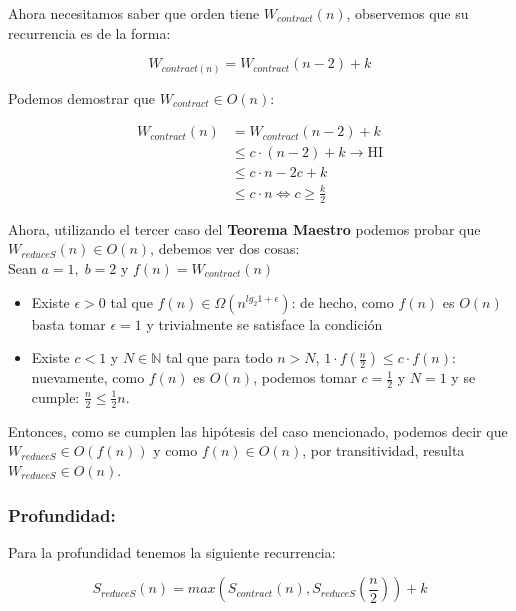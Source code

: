 \documentclass[11pt]{article}
\begin{document}
Ahora necesitamos saber que orden tiene $W_{contract}(n)$, observemos que su 
recurrencia es de la forma:

\begin{equation*}
    W_{contract(n)} = W_{contract}(n-2) + k 
\end{equation*}

Podemos demostrar que $W_{contract} \in O(n)$:

\begin{align*}
    W_{contract}(n) & = W_{contract}(n - 2) + k \\
             & \leq c \cdot (n - 2) + k \rightarrow \text{HI}\\
             & \leq c \cdot n - 2c + k \\
             & \leq c \cdot n \iff c \geq \frac{k}{2}
\end{align*}

Ahora, utilizando el tercer caso del \textbf{Teorema Maestro} podemos probar que
$W_{reduceS}(n) \in O(n)$, debemos ver dos cosas: \\

Sean $a = 1, \; b = 2$ y $f(n) = W_{contract}(n)$

\begin{itemize}
    \item Existe $\epsilon > 0$ tal que $f(n) \in \Omega(n^{lg_2 1 + \epsilon})$:
          de hecho, como $f(n)$ es $O(n)$ basta tomar $\epsilon = 1$
          y trivialmente se satisface la condición
    \item  Existe $c < 1$ y $N \in \mathbb{N}$ tal que para todo $n > N$,
           $1 \cdot f(\frac{n}{2}) \leq c \cdot f(n)$: nuevamente, como $f(n)$ es $O(n)$, 
           podemos tomar $c = \frac{1}{2}$ y $N = 1$ y se cumple: $\frac{n}{2} \leq \frac{1}{2}n$. 
\end{itemize}

Entonces, como se cumplen las hipótesis del caso mencionado,
podemos decir que $W_{reduceS} \in O(f(n))$ y como $f(n) \in O(n)$, por transitividad,
resulta $W_{reduceS} \in O(n)$. \\

\subsubsection{Profundidad:}

Para la profundidad tenemos la siguiente recurrencia:

\begin{equation*}
    S_{reduceS}(n) = max(S_{contract}(n), S_{reduceS}(\frac{n}{2})) + k
\end{equation*}
\end{document}
